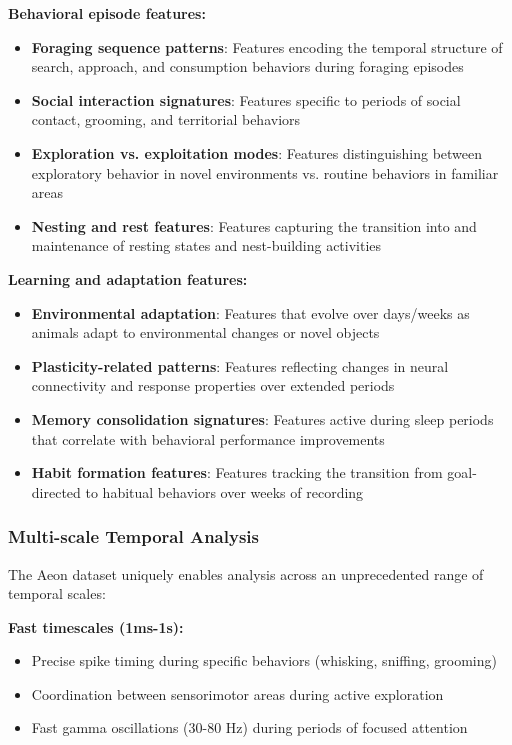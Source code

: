 \textbf{Behavioral episode features:}
\begin{itemize}
\item \textbf{Foraging sequence patterns}: Features encoding the temporal structure of search, approach, and consumption behaviors during foraging episodes
\item \textbf{Social interaction signatures}: Features specific to periods of social contact, grooming, and territorial behaviors
\item \textbf{Exploration vs. exploitation modes}: Features distinguishing between exploratory behavior in novel environments vs. routine behaviors in familiar areas
\item \textbf{Nesting and rest features}: Features capturing the transition into and maintenance of resting states and nest-building activities
\end{itemize}

\textbf{Learning and adaptation features:}
\begin{itemize}
\item \textbf{Environmental adaptation}: Features that evolve over days/weeks as animals adapt to environmental changes or novel objects
\item \textbf{Plasticity-related patterns}: Features reflecting changes in neural connectivity and response properties over extended periods
\item \textbf{Memory consolidation signatures}: Features active during sleep periods that correlate with behavioral performance improvements
\item \textbf{Habit formation features}: Features tracking the transition from goal-directed to habitual behaviors over weeks of recording
\end{itemize}

\subsubsection{Multi-scale Temporal Analysis}

The Aeon dataset uniquely enables analysis across an unprecedented range of temporal scales:

\textbf{Fast timescales (1ms-1s):}
\begin{itemize}
\item Precise spike timing during specific behaviors (whisking, sniffing, grooming)
\item Coordination between sensorimotor areas during active exploration
\item Fast gamma oscillations (30-80 Hz) during periods of focused attention
\end{itemize}

